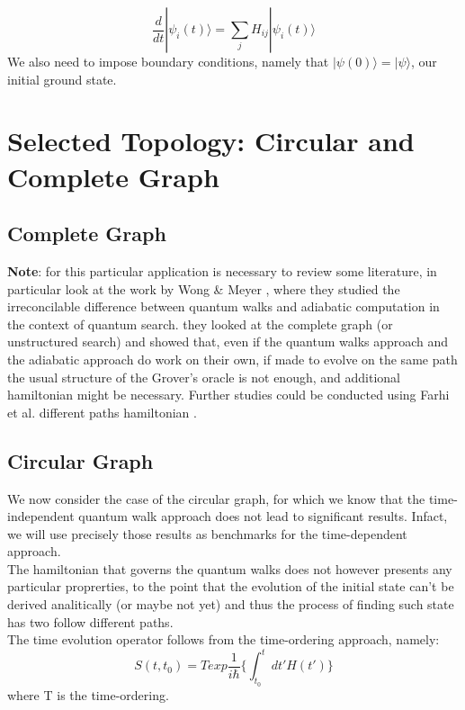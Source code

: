   \begin{equation}
  \frac{d}{dt}|\psi_i(t)\rangle = \sum_jH_{ij}|\psi_i(t)\rangle
  \end{equation}
We also need to impose boundary conditions, namely that $|\psi(0)\rangle = |\psi\rangle$, our initial ground state.


\section{Selected Topology: Circular and Complete Graph}


\subsection{Complete Graph}
\textbf{Note}: for this particular application is necessary to review some literature, in particular look at the work by Wong \& Meyer \cite{Wong2016}, where they studied the irreconcilable difference between quantum walks and adiabatic computation in the context of quantum search. they looked at the complete graph (or unstructured search) and showed that, even if the quantum walks approach and the adiabatic approach do work on their own, if made to evolve on the same path the usual structure of the Grover's oracle is not enough, and additional hamiltonian might be necessary. Further studies could be conducted using Farhi et al. different paths hamiltonian \cite{Farhi2002}.

\subsection{Circular Graph}
We now consider the case of the circular graph, for which we know that the time-independent quantum walk approach does not lead to significant results. Infact, we will use precisely those results as benchmarks for the time-dependent approach.\\
The hamiltonian that governs the quantum walks does not however presents any particular proprerties, to the point that the evolution of the initial state can't be derived analitically (or maybe not yet) and thus the process of finding such state has two follow different paths. \\
The time evolution operator follows from the time-ordering approach, namely:
  \begin{equation}
    S(t,t_0) = T exp \frac{1}{i\hbar}\Big\{ \int_{t_0}^{t} dt' H(t')\Big\}
  \end{equation}
where T is the time-ordering.

